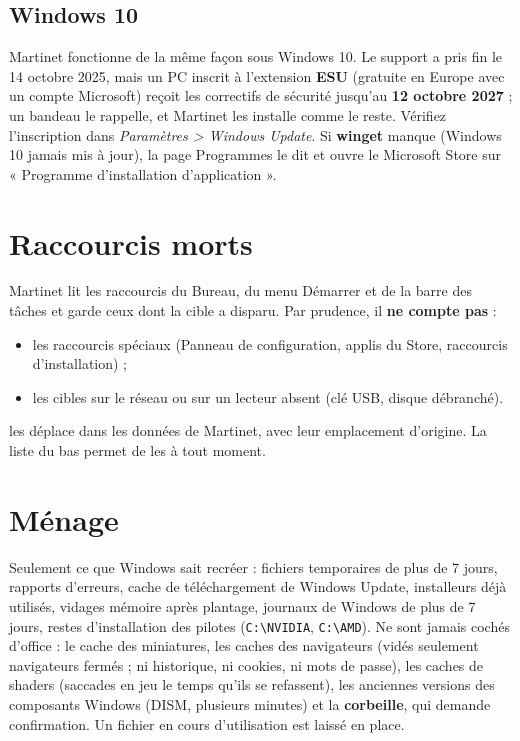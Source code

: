 
\subsection{Windows 10}

Martinet fonctionne de la même façon sous Windows 10. Le support a pris fin le 14 octobre 2025, mais
un PC inscrit à l'extension \textbf{ESU} (gratuite en Europe avec un compte Microsoft) reçoit les
correctifs de sécurité jusqu'au \textbf{12 octobre 2027} ; un bandeau le rappelle, et Martinet les
installe comme le reste. Vérifiez l'inscription dans \textit{Paramètres > Windows Update}. Si \textbf{winget} manque (Windows 10 jamais mis à jour), la page
Programmes le dit et ouvre le Microsoft Store sur « Programme d'installation d'application ».


\section{Raccourcis morts}\label{sec:raccourcis}


Martinet lit les raccourcis du Bureau, du menu Démarrer et de la barre des tâches et garde ceux dont la
cible a disparu. Par prudence, il \textbf{ne compte pas} :
\begin{itemize}
\item les raccourcis spéciaux (Panneau de configuration, applis du Store, raccourcis d'installation) ;
\item les cibles sur le réseau ou sur un lecteur absent (clé USB, disque débranché).
\end{itemize}
 les déplace dans les données de Martinet, avec leur emplacement
d'origine. La liste du bas permet de les  à tout moment.

\section{Ménage}\label{sec:menage}


Seulement ce que Windows sait recréer : fichiers temporaires de plus de 7 jours, rapports d'erreurs,
cache de téléchargement de Windows Update, installeurs déjà utilisés, vidages mémoire après plantage,
journaux de Windows de plus de 7 jours, restes d'installation des pilotes (\texttt{C:\textbackslash NVIDIA},
\texttt{C:\textbackslash AMD}). Ne sont jamais cochés d'office : le cache des miniatures, les caches des
navigateurs (vidés seulement navigateurs fermés ; ni historique, ni cookies, ni mots de passe), les caches
de shaders (saccades en jeu le temps qu'ils se refassent), les anciennes versions des composants Windows
(DISM, plusieurs minutes) et la \textbf{corbeille}, qui demande confirmation. Un fichier en cours
d'utilisation est laissé en place.

